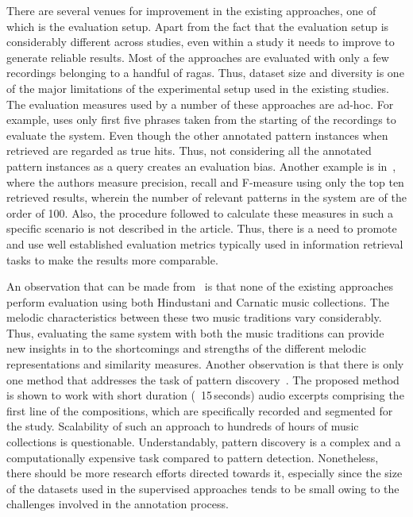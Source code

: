 There are several venues for improvement in the existing approaches, one of which is the evaluation setup. Apart from the fact that the evaluation setup is considerably different across studies, even within a study it needs to improve to generate reliable results. Most of the approaches are evaluated with only a few recordings belonging to a handful of \glspl{raga}. Thus, dataset size and diversity is one of the major limitations of the experimental setup used in the existing studies. The evaluation measures used by a number of these approaches are ad-hoc. For example, \cite{ganguli2015efficient} uses only first five phrases taken from the starting of the recordings to evaluate the system. Even though the other annotated pattern instances when retrieved are regarded as true hits. Thus, not considering all the annotated pattern instances as a query creates an evaluation bias. Another example is in~\cite{Ishwar2013}, where the authors measure precision, recall and F-measure using only the top ten retrieved results, wherein the number of relevant patterns in the system are of the order of 100. Also, the procedure followed to calculate these measures in such a specific scenario is not described in the article. Thus, there is a need to promote and use well established evaluation metrics typically used in information retrieval tasks to make the results more comparable. 

An observation that can be made from~ is that none of the existing approaches perform evaluation using both Hindustani and Carnatic music collections. The melodic characteristics between these two music traditions vary considerably. Thus, evaluating the same system with both the music traditions can provide new insights in to the shortcomings and strengths of the different melodic representations and similarity measures. Another observation is that there is only one method that addresses the task of pattern discovery~\cite{Dutta2014}. The proposed method is shown to work with short duration (~15\,seconds) audio excerpts comprising the first line of the compositions, which are specifically recorded and segmented for the study. Scalability of such an approach to hundreds of hours of music collections is questionable. Understandably, pattern discovery is a complex and a computationally expensive task compared to pattern detection. Nonetheless, there should be more research efforts directed towards it, especially since the size of the datasets used in the supervised approaches tends to be small owing to the challenges involved in the annotation process.

